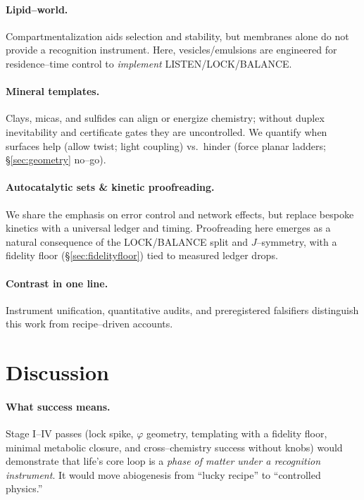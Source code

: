 \documentclass[11pt]{article}
\begin{document}
\paragraph{Lipid–world.}
Compartmentalization aids selection and stability, but membranes alone do not provide a recognition instrument. Here, vesicles/emulsions are engineered for residence–time control to \emph{implement} LISTEN/LOCK/BALANCE.

\paragraph{Mineral templates.}
Clays, micas, and sulfides can align or energize chemistry; without duplex inevitability and certificate gates they are uncontrolled. We quantify when surfaces help (allow twist; light coupling) vs.\ hinder (force planar ladders; \S\ref{sec:geometry} no–go).

\paragraph{Autocatalytic sets \& kinetic proofreading.}
We share the emphasis on error control and network effects, but replace bespoke kinetics with a universal ledger and timing. Proofreading here emerges as a natural consequence of the LOCK/BALANCE split and $J$–symmetry, with a fidelity floor (\S\ref{sec:fidelityfloor}) tied to measured ledger drops.

\paragraph{Contrast in one line.}
Instrument unification, quantitative audits, and preregistered falsifiers distinguish this work from recipe–driven accounts.

\section{Discussion}\label{sec:discussion}
\paragraph{What success means.}
Stage I–IV passes (lock spike, $\varphi$ geometry, templating with a fidelity floor, minimal metabolic closure, and cross–chemistry success without knobs) would demonstrate that life’s core loop is a \emph{phase of matter under a recognition instrument}. It would move abiogenesis from “lucky recipe” to “controlled physics.”
\end{document}
